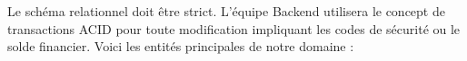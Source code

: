 Le schéma relationnel doit être strict. L'équipe Backend utilisera le concept de transactions ACID pour toute modification impliquant les codes de sécurité ou le solde financier. Voici les entités principales de notre domaine :








